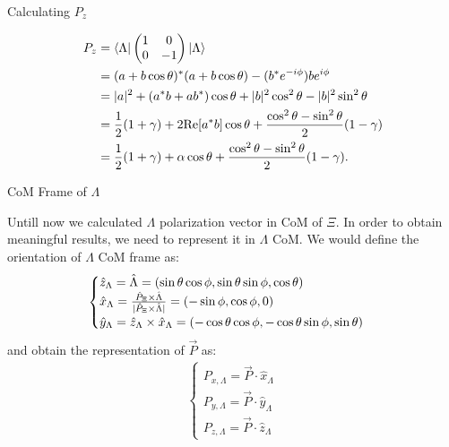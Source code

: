 \documentclass[
	xcolor=dvipsnames,
	10pt, 
	]{beamer}
\begin{document}
\begin{frame}{Calculating $P_z$}
	\begin{block}{}
		\begin{align}
			P_z& =\langle \Lambda| \begin{pmatrix} 1&0\\ 0&-1 \end{pmatrix} |\Lambda\rangle\nonumber\\
			&= (a+b\cos\theta)^*(a+b\cos\theta)-(b^*e^{-i\phi})be^{i\phi}\nonumber\\
			&= |a|^2 + (a^*b+ab^*)\cos\theta + |b|^2\cos^2\theta -|b|^2\sin^2\theta\nonumber\\
			&= \frac{1}{2}(1+\gamma) + 2\mathrm{Re}[a^*b]\cos\theta  + \frac{\cos^2\theta-\sin^2\theta}{2}(1-\gamma)\nonumber\\
			&=\frac{1}{2}(1+\gamma) + \alpha\cos\theta  + \frac{\cos^2\theta-\sin^2\theta}{2}(1-\gamma)
.		\end{align}
	\end{block}
\end{frame}
\begin{frame}{CoM Frame of $\Lambda$ }
	\begin{block}{}
		Untill now we calculated $\Lambda$ polarization vector in CoM of $\Xi$. In order to obtain meaningful results, we need to represent  it in $\Lambda$ CoM. We would define the orientation of $\Lambda$ CoM frame as:
		\begin{align}
			\begin{cases}
				\hat z_\Lambda = \hat \Lambda=(\sin\theta\cos\phi,\sin\theta\sin\phi,\cos\theta)\\
				\hat x_\Lambda = \frac{\hat P_\Xi\times\hat \Lambda}{|\hat P_\Xi\times\hat \Lambda|}=(-\sin\phi,\cos\phi,0)\\
				\hat y_\Lambda= \hat z_\Lambda\times\hat x_\Lambda=(-\cos\theta\cos\phi,-\cos\theta\sin\phi,\sin\theta)
			\end{cases}\label{LCoord}
		\end{align}
		and obtain the representation of $\vec P$ as:
		\begin{align}
			\begin{cases}
				P_{x,\Lambda} = \vec P \cdot \hat x_\Lambda\\
				P_{y,\Lambda} = \vec P \cdot \hat y_\Lambda\\
				P_{z,\Lambda} = \vec P \cdot \hat z_\Lambda
			\end{cases}
		\end{align}
	\end{block}
\end{frame}
\end{document}
